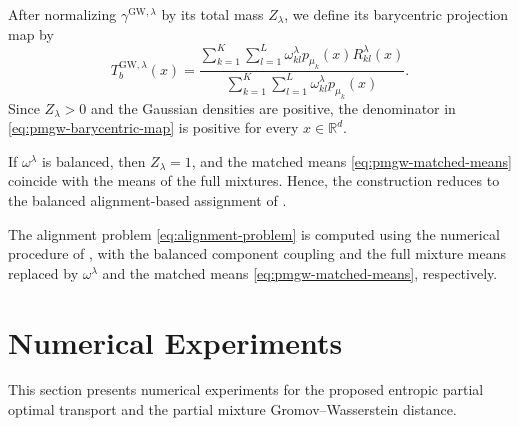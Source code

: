 \documentclass[a4paper,11pt]{article}
\numberwithin{equation}{section}
\newcommand{\RR}{\mathbb{R}}
\newcommand{\GW}{\mathrm{GW}}
\begin{document}
After normalizing $\gamma^{\GW,\lambda}$ by its total mass $Z_\lambda$, we define its barycentric projection map by
\begin{equation}\label{eq:pmgw-barycentric-map}
  T_b^{\GW,\lambda}(x)=\frac{\displaystyle\sum_{k=1}^{K}\sum_{l=1}^{L}\omega^\lambda_{kl}p_{\mu_k}(x)R_{kl}^\lambda(x)}{\displaystyle\sum_{k=1}^{K}\sum_{l=1}^{L}\omega^\lambda_{kl}p_{\mu_k}(x)}.
\end{equation}
Since $Z_\lambda>0$ and the Gaussian densities are positive, the denominator in \eqref{eq:pmgw-barycentric-map} is positive for every $x\in\RR^d$.

If $\omega^\lambda$ is balanced, then $Z_\lambda=1$, and the matched means \eqref{eq:pmgw-matched-means} coincide with the means of the full mixtures. Hence, the construction reduces to the balanced alignment-based assignment of \cite{delon-2023}.

The alignment problem \eqref{eq:alignment-problem} is computed using the numerical procedure of \cite{delon-2023}, with the balanced component coupling and the full mixture means replaced by $\omega^\lambda$ and the matched means \eqref{eq:pmgw-matched-means}, respectively.


\section{Numerical Experiments}\label{sec:numerical}
This section presents numerical experiments for the proposed entropic partial optimal transport and the partial mixture Gromov--Wasserstein distance. 
\end{document}
